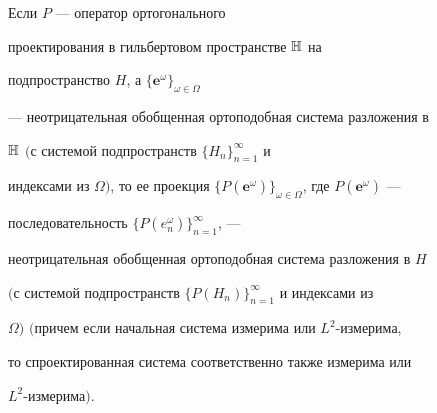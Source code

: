 \begin{thm}\hspace{-1.8mm}{\bf.}


Если $P$ --- оператор ортогонального


проектирования в гильбертовом пространстве ${\Bbb H}$ на


подпространство $H$, а $\{\boldsymbol e^\omega\}_{\omega \in\Omega}$


--- неотрицательная обобщенная ортоподобная система разложения в


$\Bbb H$ $($с системой подпространств $\{H_n\}_{n=1}^\infty$ и


индексами из $\Omega)$, то ее проекция $\{P(\boldsymbol e^\omega


)\}_{\omega\in\Omega}$, где $P(\boldsymbol e^\omega)$ ---


последовательность $\{P(e^\omega_n)\}_{n=1}^\infty$, ---


неотрицательная обобщенная ортоподобная система разложения в $H$


$($с системой подпространств $\{P(H_n)\}_{n=1}^\infty$ и индексами из


$\Omega)$ $($причем если начальная система измерима или $L^2$-измерима,


то спроектированная система соответственно также измерима или


$L^2$-измерима$)$.


\end{thm}





